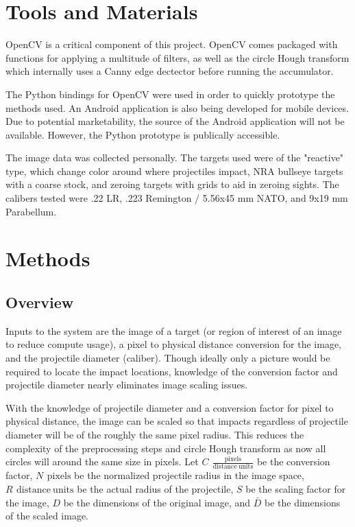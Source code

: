\documentclass{article}
\newcommand{\unit}[1]{\ensuremath{\, \mathrm{#1}}}
\begin{document}
\section{Tools and Materials}
\label{sec:tools}
OpenCV is a critical component of this project. OpenCV comes packaged with functions for
applying a multitude of filters, as well as the circle Hough transform which internally uses a
Canny edge dectector before running the accumulator.

The Python bindings for OpenCV were used in order to quickly prototype the methods used.
An Android application is also being developed for mobile devices.
Due to potential marketability, the source of the Android application will not be available.
However, the Python prototype is publically accessible.

The image data was collected personally. The targets used were of the "reactive" type, which
change color around where projectiles impact, NRA bullseye targets with a coarse stock, and
zeroing targets with grids to aid in zeroing sights. The calibers tested were .22 LR,
.223 Remington / 5.56x45 mm NATO, and 9x19 mm Parabellum.

\section{Methods}
\label{sec:methods}

\subsection{Overview}
\label{ssec:overview}
Inputs to the system are the image of a target (or region of interest of an image to reduce
compute usage), a pixel to physical distance conversion for the image,
and the projectile diameter (caliber). Though ideally only a picture would
be required to locate the impact locations, knowledge of the conversion factor and projectile
diameter nearly eliminates image scaling issues.

With the knowledge of projectile diameter and a conversion factor for pixel to physical distance,
the image can be scaled so that impacts regardless of projectile diameter will be of the roughly
the same pixel radius. This reduces the complexity of the preprocessing steps and circle Hough
transform as now all circles will around the same size in pixels.
Let \(C\ \unit{\frac{pixels}{distance\ units}}\) be the conversion factor, \(N\ \unit{pixels}\)
be the normalized projectile radius in the image space, \(R\ \unit{distance\ units}\) be the 
actual radius of the projectile, \(S\) be the scaling factor for the image, \(D\) be 
the dimensions of the original image, and \(\bar{D}\) be the dimensions of the scaled image.
\end{document}
